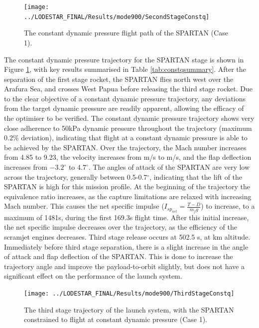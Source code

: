 \begin{figure}[ht!]
\centering
\texttt{[image: ../LODESTAR\_FINAL/Results/mode900/SecondStageConstq]}
\caption{The constant dynamic pressure flight path of the SPARTAN (Case 1).}
\label{fig:SecondStageConstq}
\end{figure}


The constant dynamic pressure trajectory for the SPARTAN stage is shown in Figure \ref{fig:SecondStageConstq}, with key results summarised in Table \ref{tab:constqsummary}. After the separation of the first stage rocket, the SPARTAN flies north west over the Arafura Sea, and crosses West Papua before releasing the third stage rocket. Due to the clear objective of a constant dynamic pressure trajectory, any deviations from the target dynamic pressure are readily apparent, allowing the efficacy of the optimiser to be verified. 
The constant dynamic pressure trajectory shows very close adherence to 50kPa dynamic pressure  throughout the trajectory (maximum 0.2\% deviation), indicating that flight at a constant dynamic pressure is able to be achieved by the SPARTAN.  
Over the trajectory, the Mach number increases from 4.85 to 9.23, the velocity increases from \firstsecondSeparationvConstqNoReturn m/s to \secondthirdSeparationvConstqNoReturn m/s, and the flap deflection increases from $-3.2^\circ$ to $4.7^\circ$. The angles of attack of the SPARTAN are very low across the trajectory, generally between 0.5-0.7$^\circ$, indicating that the lift of the SPARTAN is high for this mission profile. At the beginning of the trajectory the equivalence ratio increases, as the capture limitations are relaxed with increasing Mach number. This causes the net specific impulse ($I_{sp_{net}} = \frac{T-D}{\dot{m}_f g}$) to increase, to a maximum of 1481s, during the first 169.3s flight time.  After this initial increase, the net specific impulse decreases over the trajectory, as the efficiency of the scramjet engines decreases. 
Third stage release occurs at 502.5 s, at \secondthirdSeparationAltConstqNoReturn km altitude. Immediately before third stage separation, there is a slight increase in the angle of attack and flap deflection of the SPARTAN. This is done to increase the trajectory angle and improve the payload-to-orbit slightly, but does not have a significant effect on the performance of the launch system. 

\begin{figure}[ht!]
\centering
\texttt{[image: ../LODESTAR\_FINAL/Results/mode900/ThirdStageConstq]}
\caption{The third stage trajectory of the launch system, with the SPARTAN constrained to flight at constant dynamic pressure (Case 1).}
\label{fig:ThirdStageConstq}
\end{figure}

